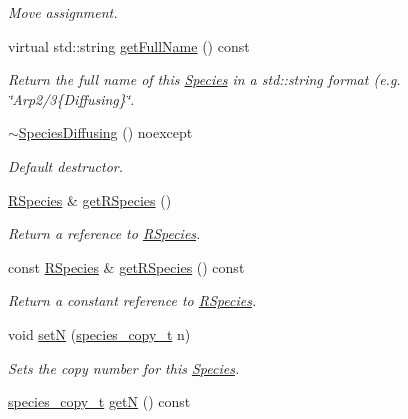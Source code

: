 \begin{DoxyCompactItemize}
\begin{DoxyCompactList}\small\item\em Move assignment. \end{DoxyCompactList}\item 
virtual std\-::string \hyperlink{classchem_1_1SpeciesDiffusing_a03eba31a17a3713e8c45cc0952e922bb}{get\-Full\-Name} () const 
\begin{DoxyCompactList}\small\item\em Return the full name of this \hyperlink{classchem_1_1Species}{Species} in a std\-::string format (e.\-g. \char`\"{}\-Arp2/3\{\-Diffusing\}\char`\"{}. \end{DoxyCompactList}\item 
\hyperlink{classchem_1_1SpeciesDiffusing_a683ab39a97cef1b68be11c68b476a840}{$\sim$\-Species\-Diffusing} () noexcept
\begin{DoxyCompactList}\small\item\em Default destructor. \end{DoxyCompactList}\item 
\hyperlink{classchem_1_1RSpecies}{R\-Species} \& \hyperlink{classchem_1_1Species_a1719a8155a69e9a62593d23d4bfc8514}{get\-R\-Species} ()
\begin{DoxyCompactList}\small\item\em Return a reference to \hyperlink{classchem_1_1RSpecies}{R\-Species}. \end{DoxyCompactList}\item 
const \hyperlink{classchem_1_1RSpecies}{R\-Species} \& \hyperlink{classchem_1_1Species_a438dae186317809effdd040ed38c568b}{get\-R\-Species} () const 
\begin{DoxyCompactList}\small\item\em Return a constant reference to \hyperlink{classchem_1_1RSpecies}{R\-Species}. \end{DoxyCompactList}\item 
void \hyperlink{classchem_1_1Species_af10a33a212fdb986fb93613e9c219f7a}{set\-N} (\hyperlink{common_8h_a3503f321fd36304ee274141275cca586}{species\-\_\-copy\-\_\-t} n)
\begin{DoxyCompactList}\small\item\em Sets the copy number for this \hyperlink{classchem_1_1Species}{Species}. \end{DoxyCompactList}\item 
\hyperlink{common_8h_a3503f321fd36304ee274141275cca586}{species\-\_\-copy\-\_\-t} \hyperlink{classchem_1_1Species_af7c9f51060b84169b428a7796dad6dca}{get\-N} () const 

\end{DoxyCompactItemize}
